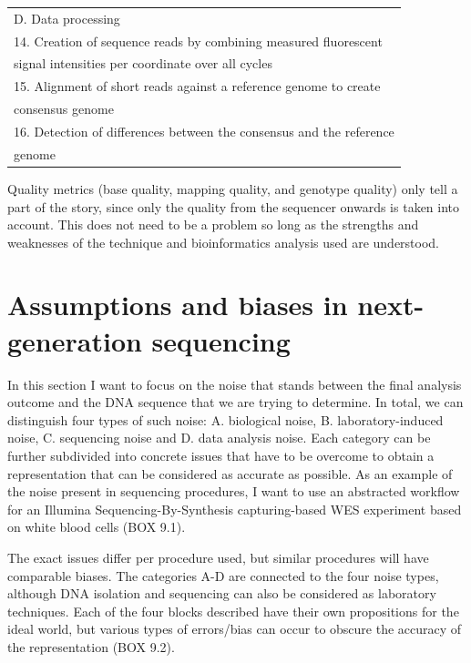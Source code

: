 \begin{table}[H]
\begin{minipage}{\textwidth}
\begin{tabular}{!{\color{deeporange}\VRule[3pt]}l!{\color{deeporange}\VRule[3pt]}}
			\\
			\setrow{\bfseries}D. Data processing \\
			14.	Creation of sequence reads by combining measured fluorescent \\ signal intensities per coordinate over all cycles \\
			15.	Alignment of short reads against a reference genome to create \\ consensus genome \\
			16.	Detection of differences between the consensus and the reference  \\ genome \\
			\hline
		\end{tabular}
	\end{minipage}
\end{table}

Quality metrics (base quality, mapping quality, and genotype quality) only tell a part of the story, since only the quality from the sequencer onwards is taken into account. 
This does not need to be a problem so long as the strengths and weaknesses of the technique and bioinformatics analysis used are understood. 

\section{Assumptions and biases in next-generation \newline sequencing} \label{Assumptions and biases in next-generation sequencing}
In this section I want to focus on the noise that stands between the final analysis outcome and the DNA sequence that we are trying to determine. 
In total, we can distinguish four types of such noise: A. biological noise, B. laboratory-induced noise, C. sequencing noise and D. data analysis noise. 
Each category can be further subdivided into concrete issues that have to be overcome to obtain a representation that can be considered as accurate as possible. 
As an example of the noise present in sequencing procedures, I want to use an abstracted workflow for an Illumina Sequencing-By-Synthesis capturing-based WES experiment based on white blood cells (BOX 9.1). 


The exact issues differ per procedure used, but similar procedures will have comparable biases. The categories A-D are connected to the four noise types, although DNA isolation and sequencing can also be considered as laboratory techniques. 
Each of the four blocks described have their own propositions for the ideal world, but various types of errors/bias can occur to obscure the accuracy of the representation (BOX 9.2). 

